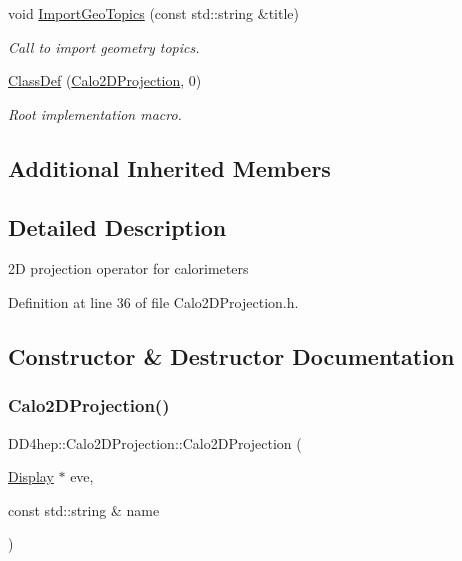 \begin{DoxyCompactItemize}
void \hyperlink{class_d_d4hep_1_1_calo2_d_projection_af922fcd5265dc3bdbab79ce228cbc6aa}{Import\+Geo\+Topics} (const std\+::string \&title)
\begin{DoxyCompactList}\small\item\em Call to import geometry topics. \end{DoxyCompactList}\item 
\hyperlink{class_d_d4hep_1_1_calo2_d_projection_a27b84375acec854d3c3fedba3519b7f4}{Class\+Def} (\hyperlink{class_d_d4hep_1_1_calo2_d_projection}{Calo2\+D\+Projection}, 0)
\begin{DoxyCompactList}\small\item\em Root implementation macro. \end{DoxyCompactList}\end{DoxyCompactItemize}
\subsection*{Additional Inherited Members}


\subsection{Detailed Description}
2D projection operator for calorimeters 

Definition at line 36 of file Calo2\+D\+Projection.\+h.



\subsection{Constructor \& Destructor Documentation}
\hypertarget{class_d_d4hep_1_1_calo2_d_projection_a80436525b8087ffb14aa82b06b8059cb}{}\label{class_d_d4hep_1_1_calo2_d_projection_a80436525b8087ffb14aa82b06b8059cb} 
\subsubsection{\texorpdfstring{Calo2\+D\+Projection()}{Calo2DProjection()}}
{\footnotesize\ttfamily D\+D4hep\+::\+Calo2\+D\+Projection\+::\+Calo2\+D\+Projection (\begin{DoxyParamCaption}\item[{\hyperlink{class_d_d4hep_1_1_display}{Display} $\ast$}]{eve,  }\item[{const std\+::string \&}]{name }\end{DoxyParamCaption})}



